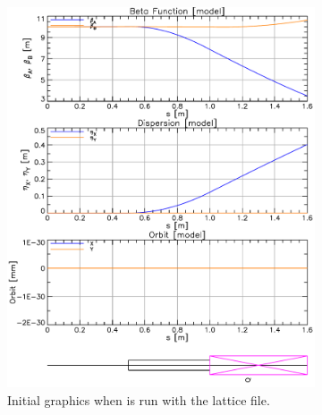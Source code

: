 \documentclass{hitec}
\begin{document}
\begin{figure}[tb]
  \centering
  \begin{subfigure}[b]{0.47\textwidth}
    \includegraphics[width=\textwidth]{lat-init.pdf}
    \caption{Initial graphics when \tao is run with the  lattice file.}
    \label{f:lat.init}
  \end{subfigure}
  \hfil
  \begin{subfigure}[b]{0.47\textwidth}

\end{subfigure}
\end{figure}
\end{document}
